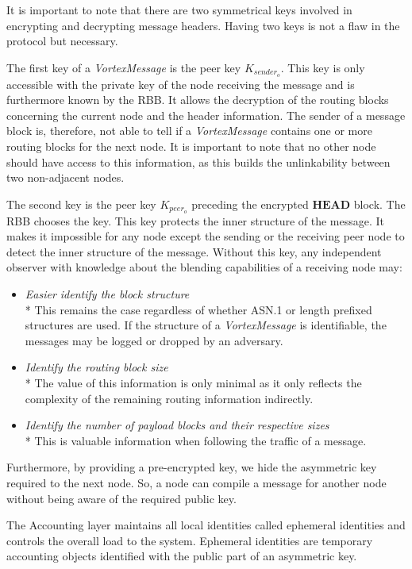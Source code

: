 \documentclass[acmsmall, screen, review]{acmart}
\begin{document}
	It is important to note that there are two symmetrical keys involved in encrypting and decrypting message headers. Having two keys is not a flaw in the protocol but necessary. 
	
	The first key of a \emph{VortexMessage} is the peer key $K_{sender_o}$. This key is only accessible with the private key of the node receiving the message and is furthermore known by the RBB. It allows the decryption of the routing blocks concerning the current node and the header information. The sender of a message block is, therefore, not able to tell if a \emph{VortexMessage} contains one or more routing blocks for the next node. It is important to note that no other node should have access to this information, as this builds the unlinkability between two non-adjacent nodes. 
	
	The second key is the peer key $K_{peer_o}$ preceding the encrypted $\mathbf{HEAD}$ block. The RBB chooses the key. This key protects the inner structure of the message. It makes it impossible for any node except the sending or the receiving peer node to detect the inner structure of the message. Without this key, any independent observer with knowledge about the blending capabilities of a receiving node may:
	\begin{itemize}
		\item \emph{Easier identify the block structure}\\*
		This remains the case regardless of whether ASN.1 or length prefixed structures are used. If the structure of a \emph{VortexMessage} is identifiable, the messages may be logged or dropped by an adversary.
		\item \emph{Identify the routing block size}\\*
		The value of this information is only minimal as it only reflects the complexity of the remaining routing information indirectly.
		\item \emph{Identify the number of payload blocks and their respective sizes}\\*
		This is valuable information when following the traffic of a message.
	\end{itemize}
	
	Furthermore, by providing a pre-encrypted key, we hide the asymmetric key required to the next node. So, a node can compile a message for another node without being aware of the required public key.
	
	The Accounting layer maintains all local identities called ephemeral identities and controls the overall load to the system. Ephemeral identities are temporary accounting objects identified with the public part of an asymmetric key. 
	
\end{document}
